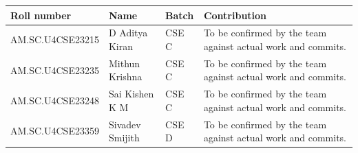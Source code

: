 \documentclass[11pt,a4paper]{article}
\begin{document}
\begin{tabularx}{\linewidth}{@{}lllY@{}}
\toprule
Roll number & Name & Batch & Contribution\\
\midrule
AM.SC.U4CSE23215 & D Aditya Kiran & CSE C & To be confirmed by the team against actual work and commits.\\
AM.SC.U4CSE23235 & Mithun Krishna & CSE C & To be confirmed by the team against actual work and commits.\\
AM.SC.U4CSE23248 & Sai Kishen K M & CSE C & To be confirmed by the team against actual work and commits.\\
AM.SC.U4CSE23359 & Sivadev Smijith & CSE D & To be confirmed by the team against actual work and commits.\\
\bottomrule
\end{tabularx}
\end{document}
